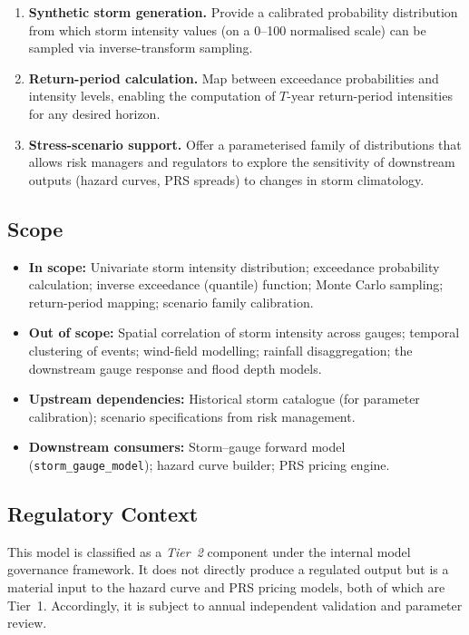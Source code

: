\documentclass[11pt,a4paper]{article}
\begin{document}
\begin{enumerate}[nosep]
    \item \textbf{Synthetic storm generation.} Provide a calibrated probability
          distribution from which storm intensity values (on a 0--100 normalised scale)
          can be sampled via inverse-transform sampling.
    \item \textbf{Return-period calculation.} Map between exceedance probabilities and
          intensity levels, enabling the computation of $T$-year return-period intensities
          for any desired horizon.
    \item \textbf{Stress-scenario support.} Offer a parameterised family of distributions
          that allows risk managers and regulators to explore the sensitivity of downstream
          outputs (hazard curves, PRS spreads) to changes in storm climatology.
\end{enumerate}

\subsection{Scope}

\begin{itemize}[nosep]
    \item \textbf{In scope:} Univariate storm intensity distribution; exceedance
          probability calculation; inverse exceedance (quantile) function; Monte Carlo
          sampling; return-period mapping; scenario family calibration.
    \item \textbf{Out of scope:} Spatial correlation of storm intensity across gauges;
          temporal clustering of events; wind-field modelling; rainfall disaggregation;
          the downstream gauge response and flood depth models.
    \item \textbf{Upstream dependencies:} Historical storm catalogue (for parameter
          calibration); scenario specifications from risk management.
    \item \textbf{Downstream consumers:} Storm--gauge forward model
          (\texttt{storm\_gauge\_model}); hazard curve builder; PRS pricing engine.
\end{itemize}

\subsection{Regulatory Context}

This model is classified as a \emph{Tier~2} component under the internal model
governance framework. It does not directly produce a regulated output but is a
material input to the hazard curve and PRS pricing models, both of which are
Tier~1. Accordingly, it is subject to annual independent validation and parameter
review.
\end{document}
